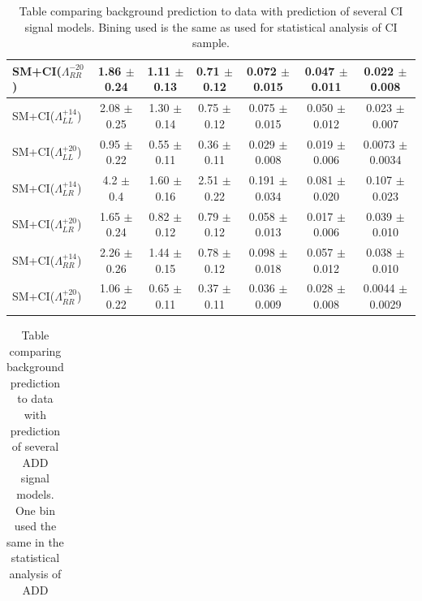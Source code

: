 \begin {table}[h]
\begin{center}
\begin{tabular}{  l | c c c | c c c  }
			SM+CI($\Lambda^{-20}_{RR}$) & 1.86 $\pm$ 0.24 & 1.11 $\pm$ 0.13 & 0.71 $\pm$ 0.12 & 0.072 $\pm$ 0.015 & 0.047 $\pm$ 0.011 & 0.022 $\pm$ 0.008 \\
			\hline
			SM+CI($\Lambda^{+14}_{LL}$) & 2.08 $\pm$ 0.25 & 1.30 $\pm$ 0.14 & 0.75 $\pm$ 0.12 & 0.075 $\pm$ 0.015 & 0.050 $\pm$ 0.012 & 0.023 $\pm$ 0.007 \\
			SM+CI($\Lambda^{+20}_{LL}$) & 0.95 $\pm$ 0.22 & 0.55 $\pm$ 0.11 & 0.36 $\pm$ 0.11 & 0.029 $\pm$ 0.008 & 0.019 $\pm$ 0.006 & 0.0073 $\pm$ 0.0034 \\
			SM+CI($\Lambda^{+14}_{LR}$) & 4.2 $\pm$ 0.4 & 1.60 $\pm$ 0.16 & 2.51 $\pm$ 0.22 & 0.191 $\pm$ 0.034 & 0.081 $\pm$ 0.020 & 0.107 $\pm$ 0.023 \\
			SM+CI($\Lambda^{+20}_{LR}$) & 1.65 $\pm$ 0.24 & 0.82 $\pm$ 0.12 & 0.79 $\pm$ 0.12 & 0.058 $\pm$ 0.013 & 0.017 $\pm$ 0.006 & 0.039 $\pm$ 0.010 \\
			SM+CI($\Lambda^{+14}_{RR}$) & 2.26 $\pm$ 0.26 & 1.44 $\pm$ 0.15 & 0.78 $\pm$ 0.12 & 0.098 $\pm$ 0.018 & 0.057 $\pm$ 0.012 & 0.038 $\pm$ 0.010 \\
			SM+CI($\Lambda^{+20}_{RR}$) & 1.06 $\pm$ 0.22 & 0.65 $\pm$ 0.11 & 0.37 $\pm$ 0.11 & 0.036 $\pm$ 0.009 & 0.028 $\pm$ 0.008 & 0.0044 $\pm$ 0.0029 \\
			\hline
	    	\hline
	  	\end{tabular}
	  	\label{tab:CI_results3}
	  	\caption{Table comparing background prediction to data with prediction of several CI signal models. Bining used is the same as used for statistical analysis of CI sample.}
	  	\end{center}
	\end {table}






	\begin {table}[h]
		\begin{center}
		\begin{tabular}{ | l | c | c | c | } 
			\hline
			
	    	\hline
	  	\end{tabular}
	  	\label{tab:ADD_results}
	  	\caption{Table comparing background prediction to data with prediction of several ADD signal models. One bin used the same in the statistical analysis of ADD}
	  	\end{center}
	\end {table}















